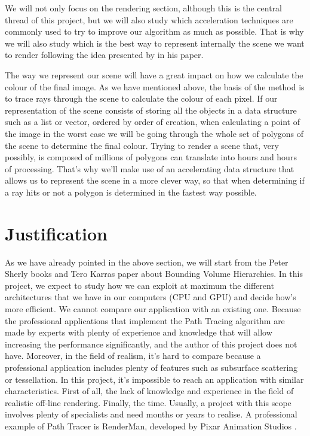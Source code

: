\documentclass[titlepage,12pt]{article}
\begin{document}
We will not only focus on the rendering section, although this is the central thread of this project, but we will also study which acceleration techniques are commonly used to try to improve our algorithm as much as possible. That is why we will also study which is the best way to represent internally the scene we want to render following the idea presented by \citep{Karras2012} in his paper.

The way we represent our scene will have a great impact on how we calculate the colour of the final image. As we have mentioned above, the basis of the method is to trace rays through the scene to calculate the colour of each pixel. If our representation of the scene consists of storing all the objects in a data structure such as a list or vector, ordered by order of creation, when calculating a point of the image in the worst case we will be going through the whole set of polygons of the scene to determine the final colour. Trying to render a scene that, very possibly, is composed of millions of polygons can translate into hours and hours of processing. That's why we'll make use of an accelerating data structure that allows us to represent the scene in a more clever way, so that when determining if a ray hits or not a polygon is determined in the fastest way possible.

\section{Justification}

As we have already pointed in the above section, we will start from the Peter Sherly books and Tero Karras paper about Bounding Volume Hierarchies. In this project, we expect to study how we can exploit at maximum the different architectures that we have in our computers (CPU and GPU) and decide how's more efficient. We cannot compare our application with an existing one. Because the professional applications that implement the Path Tracing algorithm are made by experts with plenty of experience and knowledge that will allow increasing the performance significantly, and the author of this project does not have. Moreover, in the field of realism, it's hard to compare because a professional application includes plenty of features such as subsurface scattering or tessellation. In this project, it's impossible to reach an application with similar characteristics. First of all, the lack of knowledge and experience in the field of realistic off-line rendering.
Finally, the time. Usually, a project with this scope involves plenty of specialists and need months or years to realise. A professional example of Path Tracer is RenderMan, developed by Pixar Animation Studios \citep{Christensen2018}.
\end{document}
